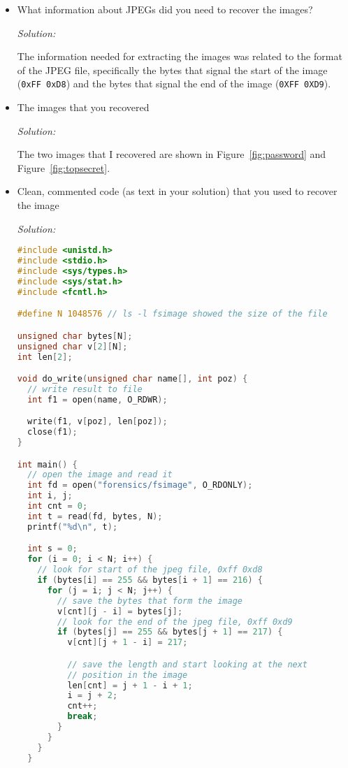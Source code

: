 \documentclass[a4paper,11pt]{article}
\newenvironment{solution}%
{\par{\noindent\small\textit{Solution:}}\vspace{-12pt}\begin{framed}}%
{\end{framed}\par}
\begin{document}
\begin{itemize}
\item What information about JPEGs did you need to recover the images?
\ifsolution\begin{solution}
The information needed for extracting the images was related to the format of the
JPEG file, specifically the bytes that signal the start of the image (\texttt{0xFF 0xD8})
and the bytes that signal the end of the image (\texttt{0XFF 0XD9}).
\end{solution}\fi

\item The images that you recovered
\ifsolution\begin{solution}
The two images that I recovered are shown in Figure~\ref{fig:password} and Figure~\ref{fig:topsecret}.

\end{solution}\fi

\item Clean, commented code (as text in your solution) that you used to
  recover the image
\ifsolution
\begin{solution}
\begin{lstlisting}[language=C]
#include <unistd.h>
#include <stdio.h>
#include <sys/types.h>
#include <sys/stat.h>
#include <fcntl.h>

#define N 1048576 // ls -l fsimage showed the size of the file

unsigned char bytes[N];
unsigned char v[2][N];
int len[2];

void do_write(unsigned char name[], int poz) {
  // write result to file
  int f1 = open(name, O_RDWR);

  write(f1, v[poz], len[poz]);
  close(f1);
}

int main() {
  // open the image and read it
  int fd = open("forensics/fsimage", O_RDONLY);
  int i, j;
  int cnt = 0;
  int t = read(fd, bytes, N);
  printf("%d\n", t);

  int s = 0;
  for (i = 0; i < N; i++) {
    // look for start of the jpeg file, 0xff 0xd8
    if (bytes[i] == 255 && bytes[i + 1] == 216) {
      for (j = i; j < N; j++) {
        // save the bytes that form the image
        v[cnt][j - i] = bytes[j];
        // look for the end of the jpeg file, 0xff 0xd9
        if (bytes[j] == 255 && bytes[j + 1] == 217) {
          v[cnt][j + 1 - i] = 217;

          // save the length and start looking at the next
          // position in the image
          len[cnt] = j + 1 - i + 1;
          i = j + 2;
          cnt++;
          break;
        }
      }
    }
  }


\end{lstlisting}
\end{solution}
\end{itemize}
\end{document}
